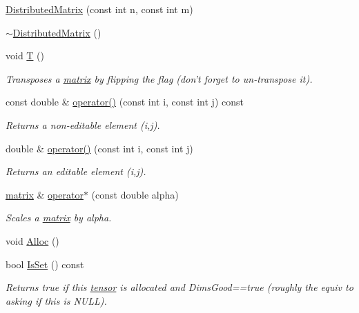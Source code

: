 \begin{DoxyCompactItemize}
\item 
\hyperlink{classJKBuilder_1_1DistributedMatrix_a2573810932403629148ce0cdbb05003c}{DistributedMatrix} (const int n, const int m)
\item 
\hyperlink{classJKBuilder_1_1DistributedMatrix_a0cfeada932c8873aaea3f86b0528c62a}{$\sim$DistributedMatrix} ()
\item 
void \hyperlink{classJKBuilder_1_1matrix_af2563817f6505e9f8a6ee5c5c209a115}{T} ()
\begin{DoxyCompactList}\small\item\em Transposes a \hyperlink{classJKBuilder_1_1matrix}{matrix} by flipping the flag (don't forget to un-\/transpose it). \item\end{DoxyCompactList}\item 
const double \& \hyperlink{classJKBuilder_1_1matrix_a9ccbac42f4eefb704f04886001f4fb3e}{operator()} (const int i, const int j) const 
\begin{DoxyCompactList}\small\item\em Returns a non-\/editable element (i,j). \item\end{DoxyCompactList}\item 
double \& \hyperlink{classJKBuilder_1_1matrix_a3d7fca183ff1c9f4c160218746f2ef31}{operator()} (const int i, const int j)
\begin{DoxyCompactList}\small\item\em Returns an editable element (i,j). \item\end{DoxyCompactList}\item 
\hyperlink{classJKBuilder_1_1matrix}{matrix} \& \hyperlink{classJKBuilder_1_1matrix_ad4799cbe4a5d07c77f41857a3ce914a2}{operator$\ast$} (const double alpha)
\begin{DoxyCompactList}\small\item\em Scales a \hyperlink{classJKBuilder_1_1matrix}{matrix} by alpha. \item\end{DoxyCompactList}\item 
void \hyperlink{classJKBuilder_1_1tensor_a0ca5cbe96d2a61f06ae4b543ef84f166}{Alloc} ()
\item 
bool \hyperlink{classJKBuilder_1_1tensor_a79c9a36acc5dbeab94033ca97971dc09}{IsSet} () const 
\begin{DoxyCompactList}\small\item\em Returns true if this \hyperlink{classJKBuilder_1_1tensor}{tensor} is allocated and DimsGood==true (roughly the equiv to asking if this is NULL). \item\end{DoxyCompactList}\item 

\end{DoxyCompactItemize}
